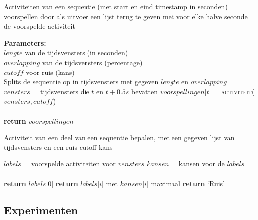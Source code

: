 \documentclass{article}
\begin{document}
\begin{algorithm}
  \caption{Activiteiten van een sequentie (met start en eind timestamp in seconden) voorspellen door als uitvoer een lijst terug te geven met voor elke halve seconde de voorspelde activiteit}
  \label{alg:sequentie}
  \begin{algorithmic}[0]
    \State \textbf{Parameters:}\\
    $lengte$ van de tijdsvensters (in seconden) \\
    $overlapping$ van de tijdsvensters (percentage) \\
    $cutoff$ voor ruis (kans) \\
    \State Splits de sequentie op in tijdsvensters met gegeven $lengte$ en $overlapping$ \\
      \State $vensters$ = tijdsvensters die $t$ en $t+0.5s$ bevatten
      \State $voorspellingen$[$t$] = \textsc{activiteit}($vensters,cutoff$) \\
    \EndFor \\
    \State \textbf{return} $voorspellingen$
  \end{algorithmic}
\end{algorithm}

\begin{algorithm}
  \caption{Activiteit van een deel van een sequentie bepalen, met een gegeven lijst van tijdsvensters en een ruis cutoff kans}
  \label{alg:deel}
  \begin{algorithmic}[0]
      \State $labels$ = voorspelde activiteiten voor $vensters$ 
      \State $kansen$ = kansen voor de $labels$ \\
       \\
        \State \textbf{return} $labels$[$0$]
      \Else
          \State \textbf{return} $labels$[$i$] met $kansen$[$i$] maximaal
        \Else
          \State \textbf{return} `Ruis'
        \EndIf
      \EndIf
    \EndProcedure
  \end{algorithmic}
\end{algorithm}

\subsection{Experimenten}
\label{experimenten}
\end{document}

